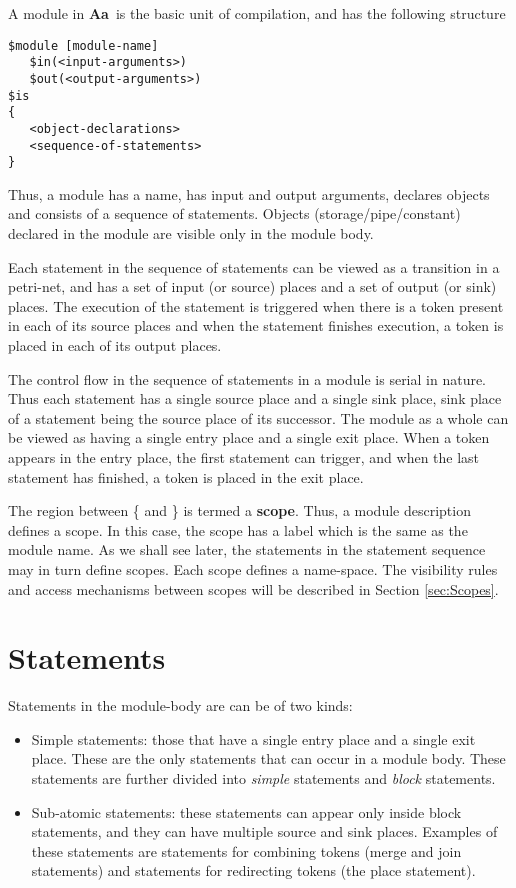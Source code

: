\documentclass{article}
\newcommand{\Aa}{{\bf Aa}~}
\begin{document}
A module in \Aa is the basic unit of compilation, and
has the following structure
\begin{verbatim}
$module [module-name] 
   $in(<input-arguments>)
   $out(<output-arguments>)
$is
{
   <object-declarations>
   <sequence-of-statements>
}
\end{verbatim}
Thus, a module has a name, has input and output arguments,
declares objects and consists of a sequence of statements.
Objects (storage/pipe/constant) declared in the module are visible only in the
module body. 

Each statement in the sequence
of statements can be viewed as a transition
in a petri-net, and has a 
set of input (or source) places  and a set of output
(or sink)  places.  
The execution of the statement is triggered when
there is a token present in each of its source 
places and when the statement finishes execution,
a token is placed in each of its output places.

The control flow in the sequence of statements
in a module is serial in nature.  Thus each
statement has a single source place and a single
sink place, sink place of a statement being 
the source place of its successor.
The module as a whole can be viewed as having
a single entry place and a single exit place.
When a token appears in the entry place, the first
statement can trigger, and when the last statement
has finished, a token is placed in the exit
place.  

The region between \{ and \} is termed a {\bf scope}.  Thus, 
a module description defines a scope.  In this case, 
the scope has a label which is the same as the module name.
As we shall see later, the statements in the statement sequence
may in turn define scopes.  Each scope defines a name-space.  
The visibility
rules and access mechanisms between scopes will be described
in Section \ref{sec:Scopes}.


\section{Statements}
 
Statements in the module-body are can be of two kinds:
\begin{itemize}
\item Simple statements: those that have a single
entry place and a single exit place.  These are
the only statements that can occur in a module body.
These statements are further divided into 
{\em simple} statements and {\em block} statements.
\item Sub-atomic statements:  these statements
can appear only inside block statements,  and they
can have multiple source and sink places.
Examples of these statements are statements for
combining tokens (merge and join statements) and
statements for redirecting tokens (the place statement).
\end{itemize}
\end{document}
